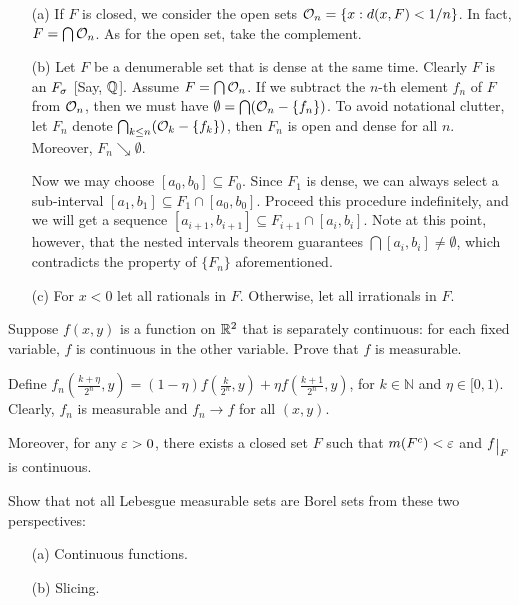 \begin{Solution}
  \begin{itemize}
    \item [(a)] If $F$ is closed, we consider the open sets $\mathcal{O}_n=\{x:d(x,F)<1/n\}$. In fact, $F=\bigcap\mathcal{O}_n$. As for the open set, take the complement.
    \item [(b)] Let $F$ be a denumerable set that is dense at the same time. Clearly $F$ is an $F_\sigma$ [Say, $\mathbb{Q}$]. Assume $F=\bigcap\mathcal{O}_n$. If we subtract the $n$-th element $f_n$ of $F$ from $\mathcal{O}_n$, then we must have $\emptyset=\bigcap(\mathcal{O}_n-\{f_n\})$. To avoid notational clutter, let $F_n$ denote $\bigcap_{k\leq n}(\mathcal{O}_k-\{f_k\})$, then $F_n$ is open and dense for all $n$. Moreover, $F_n\searrow \emptyset$.
   
    Now we may choose $[a_0,b_0]\subseteq F_0$. Since $F_1$ is dense, we can always select a sub-interval $[a_1, b_1]\subseteq F_1\cap[a_0,b_0]$. Proceed this procedure indefinitely, and we will get a sequence $[a_{i+1}, b_{i+1}]\subseteq F_{i+1}\cap[a_i,b_i]$. Note at this point, however, that the nested intervals theorem guarantees $\bigcap[a_i,b_i]\neq\emptyset$, which contradicts the property of $\{F_n\}$ aforementioned.
    \item [(c)] For $x<0$ let all rationals in $F$. Otherwise, let all irrationals in $F$.
  \end{itemize}
\end{Solution}

\begin{Exercise}
  Suppose $f(x,y)$ is a function on $\mathbb{R}^2$ that is separately continuous: for each fixed variable, $f$ is continuous in the other variable. Prove that $f$ is measurable.
\end{Exercise}

\begin{Solution}
  Define $f_n(\frac{k+\eta}{2^n},y)=(1-\eta)f(\frac{k}{2^n},y)+\eta f(\frac{k+1}{2^n},y)$, for $k\in\mathbb{N}$ and $\eta\in[0,1)$. Clearly, $f_n$ is measurable and $f_n\to f$ for all $(x,y)$.
\end{Solution}

\begin{note}
  Moreover, for any $\varepsilon>0$, there exists a closed set $F$ such that $m(F^c)<\varepsilon$ and $f\restrict{F}$ is continuous.
\end{note}

\begin{Exercise}[35']
  Show that not all Lebesgue measurable sets are Borel sets from these two perspectives:
  \begin{itemize}
    \item [(a)] Continuous functions.
    \item [(b)] Slicing.
  \end{itemize}
\end{Exercise}


